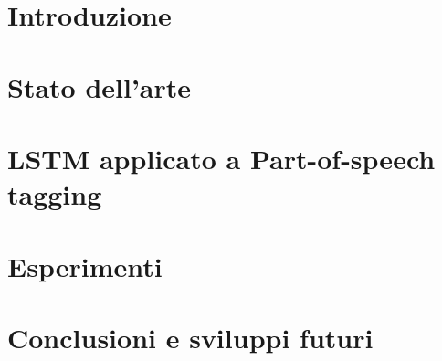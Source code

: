\documentclass[final,a4paper,openright]{book}
\begin{document}





\chapter {Introduzione}\label{chap:chap_1}


\chapter {Stato dell'arte}\label{chap:chap_2}


\chapter {LSTM applicato a Part-of-speech tagging}\label{chap:chap_3}


\chapter {Esperimenti}\label{chap:chap_4}


\chapter*{Conclusioni e sviluppi futuri}






%
\clearpage
\vspace*{6cm}

\end{document}
